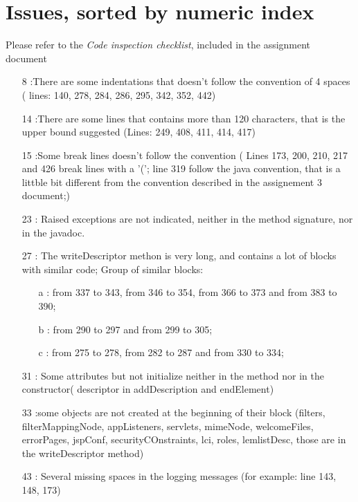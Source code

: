 \section{Issues, sorted by numeric index}
Please refer to the \textit{Code inspection checklist}, included in the assignment document

\begin{enumerate}
 \item [8]:There are some indentations that doesn't follow the convention of 4 spaces ( lines: 140, 278, 284, 286, 295, 342, 352, 442)
 \item [14]:There are some lines that contains more than 120 characters, that is the upper bound suggested (Lines: 249, 408, 411, 414, 417)
 \item [15]:Some break lines doesn't follow the convention ( Lines 173, 200, 210, 217 and 426 break lines with a '('; line 319 follow the java convention, that is a littble bit different from the convention described in the assignement 3 document;)
 \item [23]: Raised exceptions are not indicated, neither in the method signature, nor in the javadoc.
 \item [27]: The writeDescriptor methon is very long, and contains a lot of blocks with similar code; Group of similar blocks:
   \begin{itemize}
    \item[a]: from 337 to 343, from 346 to 354, from 366 to 373 and from 383 to 390;
    \item[b]: from 290 to 297 and from 299 to 305;
    \item[c]: from 275 to 278, from 282 to 287 and from 330 to 334;
   \end {itemize}
 \item[31]: Some attributes but not initialize neither in the method nor in the constructor( descriptor in addDescription and endElement)
 \item[33]:some objects are not created at the beginning of their block (filters, filterMappingNode, appListeners, servlets, mimeNode, welcomeFiles, errorPages, jspConf, securityCOnstraints, lci, roles, lemlistDesc, those are in the writeDescriptor method)
 \item [43]: Several missing spaces in the logging messages (for example: line 143, 148, 173)
\end{enumerate}

